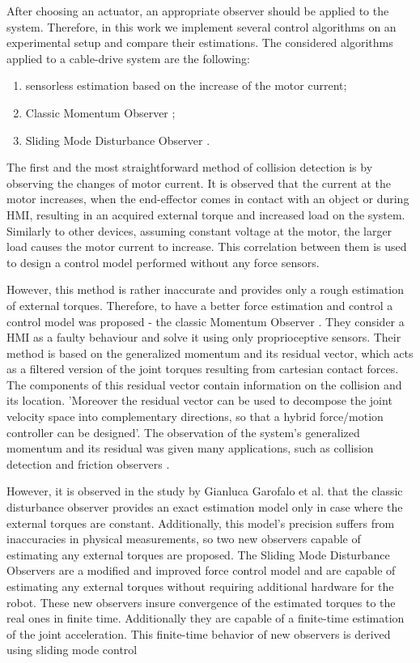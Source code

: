 After choosing an actuator, an appropriate observer should be applied to the system. Therefore, in this work we implement several control algorithms on an experimental setup and compare their estimations. The considered algorithms  applied to a cable-drive system are the following:
\begin{enumerate}
    \item sensorless estimation based on the increase of the motor current;
    \item Classic Momentum Observer \cite{momentum_obs};
    \item Sliding Mode Disturbance Observer \cite{sliding_mode}.
\end{enumerate}
The first and the most straightforward method of collision detection is by observing the changes of motor current. It is observed that the current at the motor increases, when the end-effector comes in contact with an object or during HMI, resulting in an acquired external torque and increased load on the system. Similarly to other devices, assuming constant voltage at the motor, the larger load causes the motor current to increase. This correlation between them is used to design a control model performed without any force sensors.

However, this method is rather inaccurate and provides only a rough estimation of external torques. Therefore, to have a better force estimation and control a control model was proposed - the classic Momentum Observer \cite{momentum_obs}. They consider a HMI as a faulty behaviour and solve it using only proprioceptive sensors. Their method is based on the generalized momentum and its residual vector, which acts as a filtered version of the
joint torques resulting from cartesian contact forces. The components of this residual vector contain information on the collision and its location. 'Moreover the residual vector can be used to decompose the joint velocity space into complementary directions, so that a hybrid force/motion controller can be designed'. The observation of the system's generalized momentum and its residual was given many applications, such as collision detection \cite{collision} and friction observers \cite{fric_obs}. %

However, it is observed in the study by Gianluca Garofalo et al. \cite{sliding_mode} that the classic disturbance observer provides an exact estimation model only in case where the external torques are constant. Additionally, this model's precision suffers from inaccuracies in physical measurements, so two new observers capable of estimating any external torques are proposed. The Sliding Mode Disturbance Observers are a modified and improved force control model and are capable of estimating any external torques without requiring additional hardware for the robot. These new observers insure convergence of the estimated torques to the real ones in finite time. Additionally they are capable of a finite-time estimation of the joint acceleration. This finite-time behavior of new observers is derived using sliding mode control \cite{slid_mode_control}




